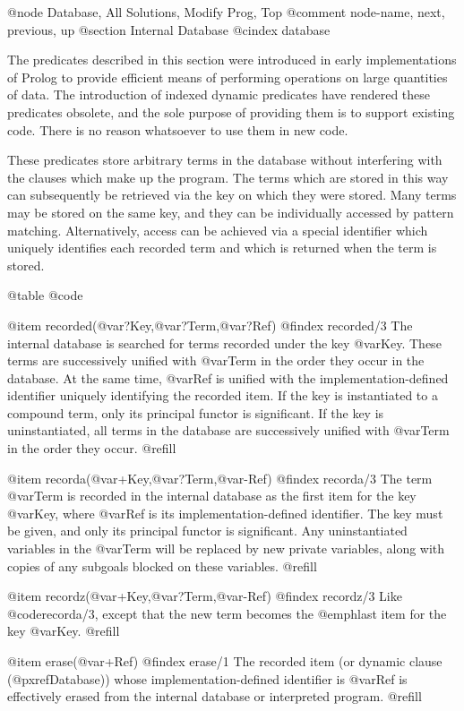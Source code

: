 @node Database, All Solutions, Modify Prog, Top
@comment  node-name,  next,  previous,  up
@section Internal Database
@cindex database

The predicates described in this section were introduced in early
implementations of Prolog to provide efficient means of performing
operations on large quantities of data.  The introduction of indexed
dynamic predicates have rendered these predicates obsolete, and the sole
purpose of providing them is to support existing code.  There is no
reason whatsoever to use them in new code.

These predicates store arbitrary terms in the
database without interfering with the clauses which make up the program.
The terms which are stored in this way can subsequently be retrieved via
the key on which they were stored.  Many terms may be stored on the same
key, and they can be individually accessed by pattern matching.
Alternatively, access can be achieved via a special identifier which
uniquely identifies each recorded term and which is returned when the
term is stored.

@table @code

@item recorded(@var{?Key},@var{?Term},@var{?Ref})
@findex recorded/3
The internal database is searched for terms recorded under the key
@var{Key}.  These terms are successively unified with @var{Term} in the
order they occur in the database.  At the same time, @var{Ref} is unified
with the implementation-defined identifier uniquely identifying the
recorded item.  If the key is instantiated to a compound term, only its
principal functor is significant.  If the key is uninstantiated, all
terms in the database are successively unified with @var{Term} in the
order they occur. @refill

@item recorda(@var{+Key},@var{?Term},@var{-Ref})
@findex recorda/3
The term @var{Term} is recorded in the internal database as the first
item for the key @var{Key}, where @var{Ref} is its
implementation-defined identifier.  The key must be given, and only its
principal functor is significant.  Any uninstantiated variables in the
@var{Term} will be replaced by new private variables, along with copies
of any subgoals blocked on these variables. @refill

@item recordz(@var{+Key},@var{?Term},@var{-Ref})
@findex recordz/3
Like @code{recorda/3}, except that the new term becomes the @emph{last}
item for the key @var{Key}. @refill

@item erase(@var{+Ref})
@findex erase/1
The recorded item (or dynamic clause (@pxref{Database})) whose
implementation-defined identifier is @var{Ref} is effectively erased from
the internal database or interpreted program. @refill

